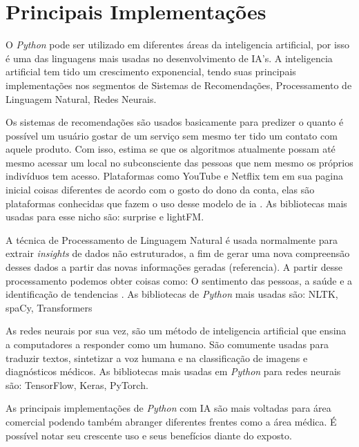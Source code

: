 \section{Principais Implementações}

O \textit{Python} pode ser utilizado em diferentes áreas da inteligencia artificial, por isso é uma das linguagens mais usadas no desenvolvimento de IA’s. A inteligencia artificial tem tido um crescimento exponencial, tendo suas principais implementações nos segmentos de Sistemas de Recomendações, Processamento de Linguagem Natural, Redes Neurais.

Os sistemas de recomendações são usados basicamente para predizer o quanto é possível um usuário gostar de um serviço sem mesmo ter tido um contato com aquele produto. Com isso, estima se que os algoritmos atualmente possam até mesmo acessar um local no subconsciente das pessoas que nem mesmo os próprios indivíduos tem acesso. Plataformas como YouTube e Netflix tem em sua pagina inicial coisas diferentes de acordo com o gosto do dono da conta, elas são plataformas conhecidas que fazem o uso desse modelo de ia \cite{didatica2024}. As bibliotecas mais usadas para esse nicho são: surprise e lightFM.

A técnica de Processamento de Linguagem Natural é usada normalmente para extrair \textit{insights} de dados não estruturados, a fim de gerar uma nova compreensão desses dados a partir das novas informações geradas (referencia). A partir desse processamento podemos obter coisas como: O sentimento das pessoas, a saúde e a identificação de tendencias \cite{google2024}. As bibliotecas de \textit{Python} mais usadas são: NLTK, spaCy, Transformers

As redes neurais por sua vez, são um método de inteligencia artificial que ensina a computadores a responder como um humano. \cite{aws2024} São comumente usadas para traduzir textos, sintetizar a voz humana e na classificação de imagens e diagnósticos médicos. As bibliotecas mais usadas em \textit{Python} para redes neurais são: TensorFlow, Keras, PyTorch.

As principais implementações de \textit{Python} com IA são mais voltadas para área comercial podendo também abranger diferentes frentes como a área médica. É possível notar seu crescente uso e seus benefícios diante do exposto.